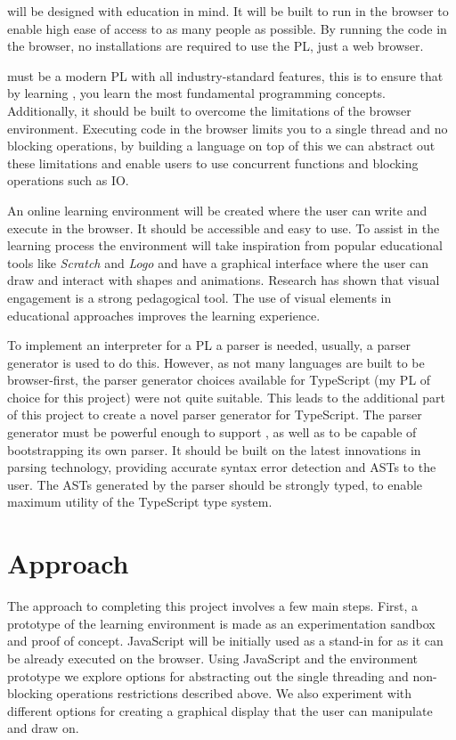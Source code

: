 \Setanta{} will be designed with education in mind.
It will be built to run in the browser to enable high ease of access to as many people as possible.
By running the code in the browser, no installations are required to use the PL, just a web browser.

\Setanta{} must be a modern PL with all industry-standard features, this is to ensure that by learning \Setanta{}, you learn the most fundamental programming concepts.
Additionally, it should be built to overcome the limitations of the browser environment.
Executing code in the browser limits you to a single thread and no blocking operations, by building a language on top of this we can abstract out these limitations and enable users to use concurrent functions and blocking operations such as IO.

An online learning environment will be created where the user can write and execute \Setanta{} in the browser.
It should be accessible and easy to use.
To assist in the learning process the environment will take inspiration from popular educational tools like \emph{Scratch} and \emph{Logo} and have a graphical interface where the user can draw and interact with shapes and animations.
Research has shown that visual engagement is a strong pedagogical tool. The use of visual elements in educational approaches improves the learning experience\cite{graphiclearning}.

To implement an interpreter for a PL a parser is needed, usually, a parser generator is used to do this.
However, as not many languages are built to be browser-first, the parser generator choices available for TypeScript (my PL of choice for this project) were not quite suitable.
This leads to the additional part of this project to create a novel parser generator for TypeScript.
The parser generator must be powerful enough to support \Setanta{}, as well as to be capable of bootstrapping its own parser.
It should be built on the latest innovations in parsing technology, providing accurate syntax error detection and ASTs to the user.
The ASTs generated by the parser should be strongly typed, to enable maximum utility of the TypeScript type system.

\section{Approach}
The approach to completing this project involves a few main steps. First, a prototype of the learning environment is made as an experimentation sandbox and proof of concept. JavaScript will be initially used as a stand-in for \Setanta{} as it can be already executed on the browser. Using JavaScript and the environment prototype we explore options for abstracting out the single threading and non-blocking operations restrictions described above. We also experiment with different options for creating a graphical display that the user can manipulate and draw on.


